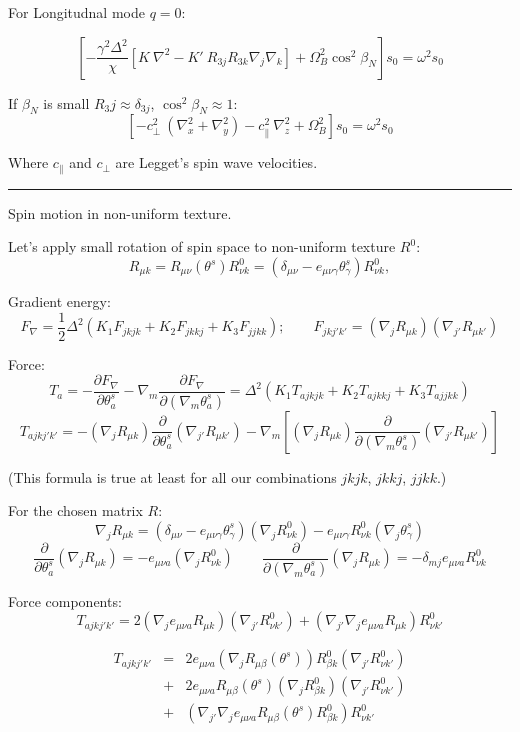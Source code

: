 \documentclass[a4paper]{article}
\begin{document}
For Longitudnal mode $q=0$:

$$
\left[ -
\frac{\gamma^2\Delta^2}{\chi}
  \left[K\ \nabla^2
  - K'\ R_{3j}R_{3k} \nabla_j\nabla_k
  \right]
+ \Omega_B^2\cos^2\beta_N
\right] s_0 =
\omega^2 s_0
$$

If $\beta_N$ is small $R_3j \approx \delta_{3j}$, $\cos^2\beta_N\approx 1$:
$$
\left[
- {c_\perp^2}\ (\nabla_x^2+\nabla_y^2)
- {c_\parallel^2}\ \nabla_z^2
+ \Omega_B^2 \right] s_0 =
\omega^2 s_0
$$

Where $c_\parallel$ and $c_\perp$ are Legget's spin wave velocities.

\eject
\hrule
\medskip

Spin motion in non-uniform texture.

Let's apply small rotation of spin space to non-uniform texture $R^0$:
$$
R_{\mu k} = R_{\mu\nu}(\theta^s) R^0_{\nu k} =
(\delta_{\mu\nu} - e_{\mu\nu\gamma}\theta^s_\gamma) R^0_{\nu k},
$$

Gradient energy:
$$
F_\nabla = \frac12 \Delta^2 ( K_1 F_{jkjk} + K_2 F_{jkkj} + K_3 F_{jjkk});
\qquad
F_{jkj'k'} = (\nabla_j R_{\mu k})(\nabla_{j'} R_{\mu k'})
$$

Force:
$$
T_a = - \frac{\partial F_\nabla}{\partial\theta^s_a}
- \nabla_m \frac{\partial F_\nabla}{\partial(\nabla_m\theta^s_a)} =
\Delta^2 ( K_1 T_{ajkjk} + K_2 T_{ajkkj} + K_3 T_{ajjkk})
$$
$$
T_{ajkj'k'} =
- (\nabla_j R_{\mu k})
  \frac{\partial}{\partial\theta^s_a} (\nabla_{j'} R_{\mu k'})
- \nabla_m \left[
  (\nabla_j R_{\mu k})
  \frac{\partial}{\partial(\nabla_m\theta^s_a)} (\nabla_{j'} R_{\mu k'})\right]
$$

(This formula is true at least for all our combinations $jkjk$, $jkkj$, $jjkk$.)

For the chosen matrix $R$:
$$
\nabla_j R_{\mu k} =
(\delta_{\mu\nu} - e_{\mu\nu\gamma}\theta^s_\gamma)(\nabla_j R^0_{\nu k})
- e_{\mu\nu \gamma} R^0_{\nu k} (\nabla_j \theta^s_\gamma)
$$
$$
\frac{\partial}{\partial\theta^s_a} (\nabla_j R_{\mu k}) =
- e_{\mu\nu a} (\nabla_j R^0_{\nu k})
\qquad
\frac{\partial}{\partial(\nabla_m\theta^s_a)} (\nabla_j R_{\mu k}) =
- \delta_{mj} e_{\mu\nu a} R^0_{\nu k}
$$

Force components:
$$
T_{ajkj'k'} =
2 (\nabla_j e_{\mu\nu a} R_{\mu k}) (\nabla_{j'} R^0_{\nu k'})
+  ( \nabla_{j'} \nabla_j e_{\mu\nu a} R_{\mu k}) R^0_{\nu k'}
$$


\begin{eqnarray*}
T_{ajkj'k'}
&=& 2 e_{\mu\nu a} (\nabla_j R_{\mu\beta}(\theta^s)) R^0_{\beta k} (\nabla_{j'} R^0_{\nu k'})\\
&+& 2 e_{\mu\nu a} R_{\mu\beta}(\theta^s) (\nabla_j R^0_{\beta k}) (\nabla_{j'} R^0_{\nu k'})\\
&+&  ( \nabla_{j'} \nabla_j e_{\mu\nu a} R_{\mu\beta}(\theta^s) R^0_{\beta k}) R^0_{\nu k'}\\
\end{eqnarray*}
\end{document}
